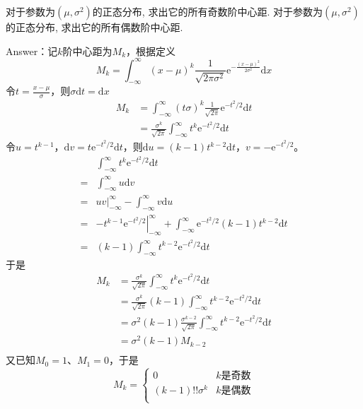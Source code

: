 \exer 对于参数为$(\mu, \sigma^2)$的正态分布, 求出它的所有奇数阶中心距.
\exer 对于参数为$(\mu, \sigma^2)$的正态分布, 求出它的所有偶数阶中心距.\par
Answer：记$k$阶中心距为$M_k$，根据定义
\[M_k=\int_{-\infty}^\infty (x-\mu)^k\frac{1}{\sqrt{2\pi\sigma^2}}\mathrm e^{-\frac{(x-\mu)^2}{2\sigma^2}}\mathrm{d}x\]
令$t=\frac{x-\mu}{\sigma}$，则$\sigma\mathrm dt = \mathrm dx$
\begin{align*}
M_k&=\int_{-\infty}^\infty (t\sigma)^k\frac{1}{\sqrt{2\pi}}\mathrm e^{-t^2/2}\mathrm{d}t \\
&=\frac{\sigma^k}{\sqrt{2\pi}}\int_{-\infty}^\infty t^k\mathrm e^{-t^2/2}\mathrm{d}t
\end{align*}
令$u=t^{k-1}$，$\mathrm{d}v=t\mathrm{e}^{-t^2/2}\mathrm{d}t$，则$
\mathrm{d}u=(k-1)t^{k-2}\mathrm{d}t$，$v=-\mathrm e^{-t^2/2}$。
\begin{align*}
 &\int_{-\infty}^\infty t^{k}\mathrm e^{-t^2/2}\mathrm{d}t \\
=&\int_{-\infty}^\infty u\mathrm dv \\
=&\left.uv\right|_{-\infty}^\infty - \int_{-\infty}^\infty v\mathrm du \\
=& \left.-t^{k-1}\mathrm e^{-t^2/2}\right|_{-\infty}^\infty +\int_{-\infty}^\infty \mathrm e^{-t^2/2}(k-1)t^{k-2}\mathrm{d}t \\
=&(k-1)\int_{-\infty}^\infty t^{k-2}\mathrm e^{-t^2/2}\mathrm{d}t
\end{align*}
于是
\begin{align*}
M_k&=\frac{\sigma^k}{\sqrt{2\pi}}\int_{-\infty}^\infty t^k\mathrm e^{-t^2/2}\mathrm{d}t \\
&=\frac{\sigma^k}{\sqrt{2\pi}}(k-1)\int_{-\infty}^\infty t^{k-2}\mathrm e^{-t^2/2}\mathrm{d}t \\
&=\sigma^2(k-1)\frac{\sigma^{k-2}}{\sqrt{2\pi}}\int_{-\infty}^\infty t^{k-2}\mathrm e^{-t^2/2}\mathrm{d}t \\
&=\sigma^2(k-1)M_{k-2} \\
\end{align*}
又已知$M_0=1$、$M_1=0$，于是
\[M_k=\begin{cases}
0 & k\text{是奇数} \\
(k-1)!!\sigma^k & k\text{是偶数} \\
\end{cases}\]

